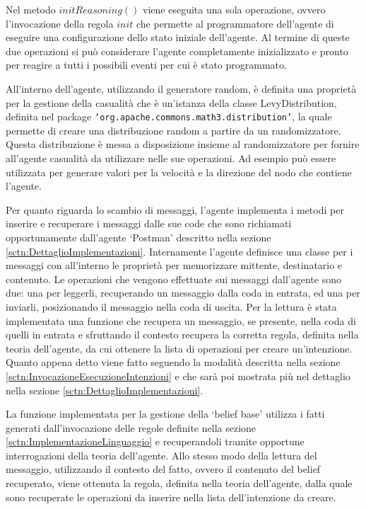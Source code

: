 Nel metodo $initReasoning()$ viene eseguita una sola operazione, ovvero l'invocazione della regola $init$ che permette al programmatore dell'agente di eseguire una configurazione dello stato iniziale dell'agente.
Al termine di queste due operazioni si può considerare l'agente completamente inizializzato e pronto per reagire a tutti i possibili eventi per cui è stato programmato.

All'interno dell'agente, utilizzando il generatore random, è definita una proprietà per la gestione della casualità che è un'istanza della classe LevyDistribution, definita nel package \texttt{`org.apache.commons.math3.distribution'}, la quale permette di creare una distribuzione random a partire da un randomizzatore. Questa distribuzione è messa a disposizione insieme al randomizzatore per fornire all'agente casualità da utilizzare nelle sue operazioni. Ad esempio può essere utilizzata per generare valori per la velocità e la direzione del nodo che contiene l'agente.

Per quanto riguarda lo scambio di messaggi, l'agente implementa i metodi per inserire e recuperare i messaggi dalle sue code che sono richiamati opportunamente dall'agente `Postman' descritto nella sezione \ref{sctn:DettaglioImplementazioni}.
Internamente l'agente definisce una classe per i messaggi con all'interno le proprietà per memorizzare mittente, destinatario e contenuto.
Le operazioni che vengono effettuate sui messaggi dall'agente sono due: una per leggerli, recuperando un messaggio dalla coda in entrata, ed una per inviarli, posizionando il messaggio nella coda di uscita.
Per la lettura è stata implementata una funzione che recupera un messaggio, se presente, nella coda di quelli in entrata e sfruttando il contesto recupera la corretta regola, definita nella teoria dell'agente, da cui ottenere la lista di operazioni per creare un'intenzione. Quanto appena detto viene fatto seguendo la modalità descritta nella sezione \ref{sctn:InvocazioneEsecuzioneIntenzioni} e che sarà poi mostrata più nel dettaglio nella sezione \ref{sctn:DettaglioImplementazioni}.

La funzione implementata per la gestione della `belief base' utilizza i fatti generati dall'invocazione delle regole definite nella sezione \ref{sctn:ImplementazioneLinguaggio} e recuperandoli tramite opportune interrogazioni della teoria dell'agente. Allo stesso modo della lettura del messaggio, utilizzando il contesto del fatto, ovvero il contenuto del belief recuperato, viene ottenuta la regola, definita nella teoria dell'agente, dalla quale sono recuperate le operazioni da inserire nella lista dell'intenzione da creare.


